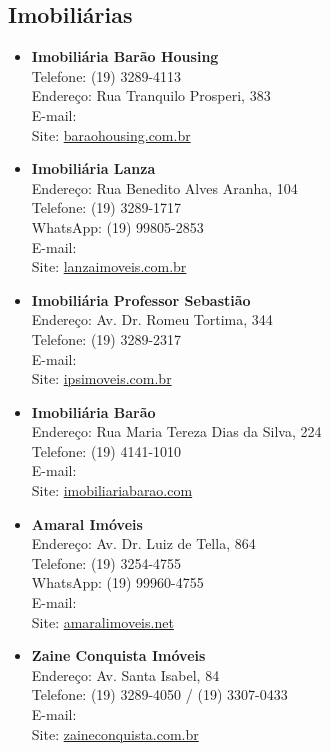 \subsection{Imobiliárias}

\begin{itemize}
\item \textbf{Imobiliária Barão Housing}
  \\Telefone: (19) 3289-4113
  \\Endereço: Rua Tranquilo Prosperi, 383
  \\E-mail: 
  \\Site: \url{baraohousing.com.br}

\item \textbf{Imobiliária Lanza}
  \\Endereço: Rua Benedito Alves Aranha, 104
  \\Telefone: (19) 3289-1717
  \\WhatsApp: (19) 99805-2853
  \\E-mail: 
  \\Site: \url{lanzaimoveis.com.br}

\item \textbf{Imobiliária Professor Sebastião}
  \\Endereço: Av. Dr. Romeu Tortima, 344
  \\Telefone: (19) 3289-2317
  \\E-mail: 
  \\Site: \url{ipsimoveis.com.br}

\item \textbf{Imobiliária Barão}
  \\Endereço: Rua Maria Tereza Dias da Silva, 224
  \\Telefone: (19) 4141-1010
  \\E-mail: 
  \\Site: \url{imobiliariabarao.com}

\item \textbf{Amaral Imóveis}
  \\Endereço: Av. Dr. Luiz de Tella, 864
  \\Telefone: (19) 3254-4755
  \\WhatsApp: (19) 99960-4755
  \\E-mail: 
  \\Site: \url{amaralimoveis.net}

\item \textbf{Zaine Conquista Imóveis}
  \\Endereço: Av. Santa Isabel, 84
  \\Telefone: (19) 3289-4050 / (19) 3307-0433
  \\E-mail: 
  \\Site: \url{zaineconquista.com.br}


\end{itemize}
